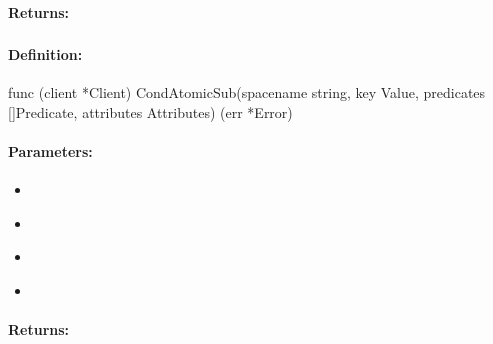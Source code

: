\paragraph{Returns:}


\pagebreak
\subsubsection{}
\label{api:Go:CondAtomicSub}


\paragraph{Definition:}
\begin{gocode}
func (client *Client) CondAtomicSub(spacename string, key Value, predicates []Predicate, attributes Attributes) (err *Error)
\end{gocode}

\paragraph{Parameters:}
\begin{itemize}[noitemsep]
\item {}\\

\item {}\\

\item {}\\

\item {}\\

\end{itemize}

\paragraph{Returns:}


\pagebreak
\subsubsection{}
\label{api:Go:GroupAtomicSub}


